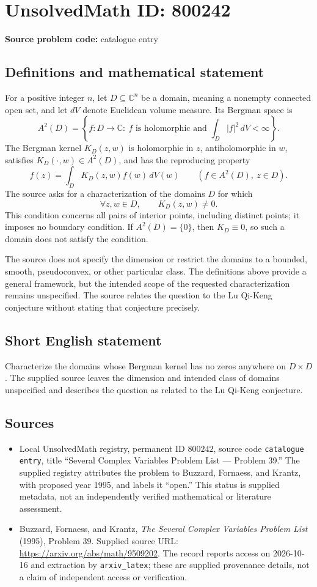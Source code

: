 \documentclass[11pt]{article}
\newcommand{\C}{\mathbb{C}}
\begin{document}
\section*{UnsolvedMath ID: 800242}
\textbf{Source problem code:} catalogue entry
\subsection{Definitions and mathematical statement}
For a positive integer \(n\), let \(D\subseteq\C^n\) be a domain, meaning a nonempty connected open set, and let \(dV\) denote Euclidean volume measure. Its Bergman space is
\[
A^2(D)=\left\{f:D\to\C:\ f\text{ is holomorphic and }\int_D|f|^2\,dV<\infty\right\}.
\]
The Bergman kernel \(K_D(z,w)\) is holomorphic in \(z\), antiholomorphic in \(w\), satisfies \(K_D(\cdot,w)\in A^2(D)\), and has the reproducing property
\[
f(z)=\int_D K_D(z,w)f(w)\,dV(w)
\qquad(f\in A^2(D),\ z\in D).
\]
The source asks for a characterization of the domains \(D\) for which
\[
\forall z,w\in D,\qquad K_D(z,w)\ne0.
\]
This condition concerns all pairs of interior points, including distinct points; it imposes no boundary condition. If \(A^2(D)=\{0\}\), then \(K_D\equiv0\), so such a domain does not satisfy the condition.

The source does not specify the dimension or restrict the domains to a bounded, smooth, pseudoconvex, or other particular class. The definitions above provide a general framework, but the intended scope of the requested characterization remains unspecified. The source relates the question to the Lu Qi-Keng conjecture without stating that conjecture precisely.
\subsection{Short English statement}
Characterize the domains whose Bergman kernel has no zeros anywhere on \(D\times D\). The supplied source leaves the dimension and intended class of domains unspecified and describes the question as related to the Lu Qi-Keng conjecture.
\subsection{Sources}
\begin{itemize}
\item Local UnsolvedMath registry, permanent ID \(800242\), source code \texttt{catalogue entry}, title ``Several Complex Variables Problem List --- Problem 39.'' The supplied registry attributes the problem to Buzzard, Fornaess, and Krantz, with proposed year 1995, and labels it ``open.'' This status is supplied metadata, not an independently verified mathematical or literature assessment.
\item Buzzard, Fornaess, and Krantz, \emph{The Several Complex Variables Problem List} (1995), Problem 39. Supplied source URL: \url{https://arxiv.org/abs/math/9509202}. The record reports access on 2026-10-16 and extraction by \texttt{arxiv\_latex}; these are supplied provenance details, not a claim of independent access or verification.
\end{itemize}
\end{document}
